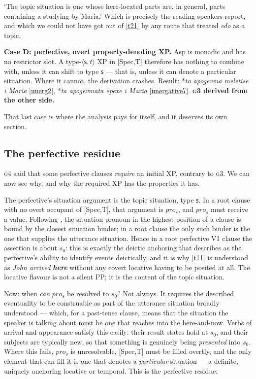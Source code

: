 \documentclass[11pt]{article}
\newcommand{\prs}{\ensuremath{pro_{s}}\xspace}
\newcommand{\sit}{\ensuremath{\mathsf{s}}\xspace}
\newcommand{\ty}[1]{\ensuremath{\langle #1 \rangle}}
\begin{document}
\medskip
\noindent`The topic situation is one whose here-located parts are, in general, parts containing a studying by Maria.'  Which is precisely the reading speakers report, and which we could not have got out of \ref{t21} by any route that treated \emph{edo} as a topic.

\medskip\noindent\textbf{Case D: perfective, overt property-denoting XP.}  Asp is monadic and has no restrictor slot.  A type-\ty{\sit,t} XP in [Spec,T] therefore has nothing to combine with, unless it can shift to type \sit{} --- that is, unless it can denote a particular situation.  Where it cannot, the derivation crashes.  Result: *\emph{to apogevma meletise i Maria} \ref{unerg2}, *\emph{ta apogevmata epexe i Maria} \ref{unergative7}.  \textbf{\textsc{g3} derived from the other side.}

\medskip
That last case is where the analysis pays for itself, and it deserves its own section.

\subsection{The perfective residue}\label{pfvxp}

\textsc{g4} said that some perfective clauses \emph{require} an initial XP, contrary to \textsc{g3}.  We can now see why, and why the required XP has the properties it has.

The perfective's situation argument is the topic situation, type \sit.  In a root clause with no overt occupant of [Spec,T], that argument is \prs, and \prs{} must receive a value.  Following \citet{percus:00}, the situation pronoun in the highest position of a clause is bound by the closest situation binder; in a root clause the only such binder is the one that supplies the utterance situation.  Hence in a root perfective V1 clause the assertion is about $s_{0}$: this is exactly the deictic anchoring that \citet{alexiadou:11b} describes as the perfective's ability to identify events deictically, and it is why \ref{t11} is understood as \emph{John arrived \textbf{here}} without any covert locative having to be posited at all.  The locative flavour is not a silent PP; it is the content of the topic situation.

Now: when \emph{can} \prs{} be resolved to $s_{0}$?  Not always.  It requires the described eventuality to be construable as part of the utterance situation broadly understood --- which, for a past-tense clause, means that the situation the speaker is talking about must be one that reaches into the here-and-now.  Verbs of arrival and appearance satisfy this easily: their result states hold at $s_{0}$, and their subjects are typically new, so that something is genuinely being \emph{presented} into $s_{0}$.  Where this fails, \prs{} is unresolvable, [Spec,T] must be filled overtly, and the only element that can fill it is one that denotes a \emph{particular} situation --- a definite, uniquely anchoring locative or temporal.  This is the perfective residue:
\end{document}
